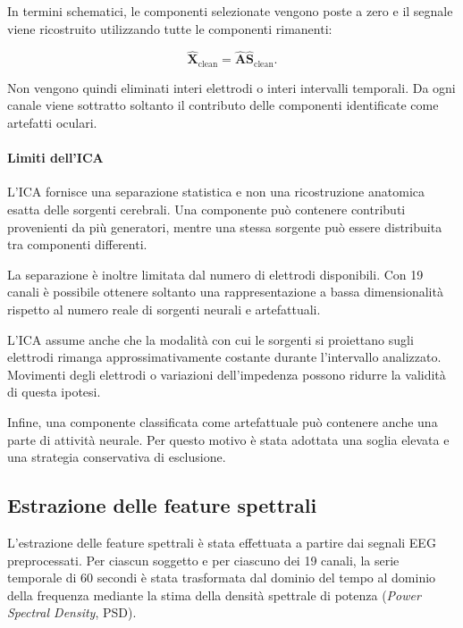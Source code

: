 In termini schematici, le componenti selezionate vengono poste a zero
e il segnale viene ricostruito utilizzando tutte le componenti
rimanenti:

\begin{equation}
	\widehat{\mathbf{X}}_{\mathrm{clean}}
	=
	\widehat{\mathbf{A}}
	\widehat{\mathbf{S}}_{\mathrm{clean}}.
\end{equation}

Non vengono quindi eliminati interi elettrodi o interi intervalli
temporali. Da ogni canale viene sottratto soltanto il contributo delle
componenti identificate come artefatti oculari.


\paragraph{Limiti dell'ICA}

L'ICA fornisce una separazione statistica e non una ricostruzione
anatomica esatta delle sorgenti cerebrali. Una componente può
contenere contributi provenienti da più generatori, mentre una stessa
sorgente può essere distribuita tra componenti differenti.

La separazione è inoltre limitata dal numero di elettrodi disponibili.
Con 19 canali è possibile ottenere soltanto una rappresentazione a
bassa dimensionalità rispetto al numero reale di sorgenti neurali e
artefattuali.

L'ICA assume anche che la modalità con cui le sorgenti si proiettano
sugli elettrodi rimanga approssimativamente costante durante
l'intervallo analizzato. Movimenti degli elettrodi o variazioni
dell'impedenza possono ridurre la validità di questa ipotesi.

Infine, una componente classificata come artefattuale può contenere
anche una parte di attività neurale. Per questo motivo è stata
adottata una soglia elevata e una strategia conservativa di
esclusione.

\subsection{Estrazione delle feature spettrali}

L'estrazione delle feature spettrali è stata effettuata a partire
dai segnali EEG preprocessati. Per ciascun soggetto e per ciascuno
dei 19 canali, la serie temporale di 60 secondi è stata trasformata
dal dominio del tempo al dominio della frequenza mediante la stima
della densità spettrale di potenza
(\textit{Power Spectral Density}, PSD).

